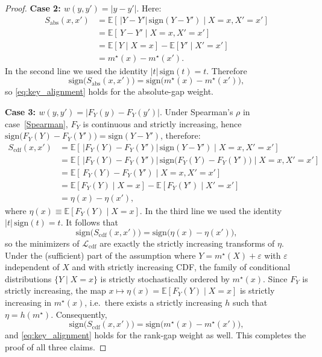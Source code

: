 \documentclass[11pt]{article}
\theoremstyle{plain}
\theoremstyle{plain}
\theoremstyle{plain}
\theoremstyle{plain}
\theoremstyle{plain}
\theoremstyle{plain}
\theoremstyle{plain}
\begin{document}
\begin{proof}
\noindent\textbf{Case 2: $w(y,y') = |y-y'|$}.
Here:
\begin{align*}
S_{\mathrm{abs}}(x,x')
&= \mathbb{E}\!\left[\,|Y-Y'|\,\mathrm{sign}(Y-Y') \mid X=x,X'=x' \right] \\
&= \mathbb{E}\!\left[\,Y-Y' \mid X=x,X'=x' \right] \\
&= \mathbb{E}[Y\mid X=x] - \mathbb{E}[Y'\mid X'=x'] \\
&= m^\star(x) - m^\star(x').
\end{align*}
In the second line we used the identity $|t|\,\mathrm{sign}(t)=t$. Therefore
\[
\mathrm{sign}\!\big(S_{\mathrm{abs}}(x,x')\big)
=
\mathrm{sign}\!\big(m^\star(x)-m^\star(x')\big),
\]
so \eqref{eq:key_alignment} holds for the absolute-gap weight.

\smallskip
\noindent\textbf{Case 3: $w(y,y') = |F_Y(y)-F_Y(y')|$}.
Under Spearman's $\rho$ in case~\ref{Spearman}, $F_Y$ is continuous and strictly increasing, hence $\mathrm{sign}\!\big(F_Y(Y)-F_Y(Y')\big)=\mathrm{sign}(Y-Y')$, therefore:
\begin{align*}
S_{\mathrm{cdf}}(x,x')
&= \mathbb{E}\!\left[\,|F_Y(Y)-F_Y(Y')|\,\mathrm{sign}(Y-Y') \mid X=x,X'=x' \right] \\
&= \mathbb{E}\!\left[\,|F_Y(Y)-F_Y(Y')|\,\mathrm{sign}\!\big(F_Y(Y)-F_Y(Y')\big) \mid X=x,X'=x' \right] \\
&= \mathbb{E}\!\left[\,F_Y(Y)-F_Y(Y') \mid X=x,X'=x' \right] \\
&= \mathbb{E}\!\left[F_Y(Y)\mid X=x\right] - \mathbb{E}\!\left[F_Y(Y')\mid X'=x'\right] \\
&= \eta(x) - \eta(x'),
\end{align*}
where $\eta(x)\equiv \mathbb{E}[F_Y(Y)\mid X=x]$. In the third line we used the identity
$|t|\,\mathrm{sign}(t)=t$. It follows that
\[
\mathrm{sign}\!\big(S_{\mathrm{cdf}}(x,x')\big)
=
\mathrm{sign}\!\big(\eta(x)-\eta(x')\big),
\]
so the minimizers of $\mathcal{L}_{\mathrm{cdf}}$ are exactly the strictly increasing transforms
of $\eta$. Under the (sufficient) part of the assumption where $Y=m^\star(X)+\varepsilon$ with $\varepsilon$
independent of $X$ and with strictly increasing CDF, the family of conditional distributions
$\{Y\mid X=x\}$ is strictly stochastically ordered by $m^\star(x)$. Since $F_Y$ is strictly
increasing, the map $x\mapsto \eta(x)=\mathbb{E}[F_Y(Y)\mid X=x]$ is strictly increasing in
$m^\star(x)$, i.e.\ there exists a strictly increasing $h$ such that $\eta=h( m^\star)$.
Consequently,
\[
\mathrm{sign}\!\big(S_{\mathrm{cdf}}(x,x')\big)
=
\mathrm{sign}\!\big(m^\star(x)-m^\star(x')\big),
\]
and \eqref{eq:key_alignment} holds for the rank-gap weight as well. This completes the proof of all three claims.
\end{proof}
\end{document}

